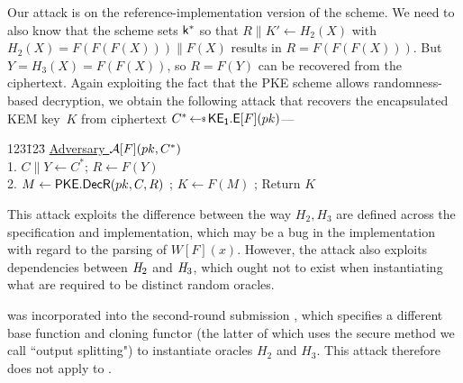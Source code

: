 Our attack is on the reference-implementation version of the scheme. We need to also know that the scheme sets $\mathsf{k}^*$ so that $R\|K'\gets H_2(X)$ with $H_2(X) = F(F(F(X)))\|F(X)$ results in $R = F(F(F(X)))$. But $Y=H_3(X) = F(F(X))$, so $R=F(Y)$ can be recovered from the ciphertext. Again exploiting the fact that the PKE scheme allows randomness-based decryption, we obtain the following attack that recovers the encapsulated KEM key~$K$ from  ciphertext $C^* \allowbreak \getsr \allowbreak \GkemEnc{1}[F](\pk)$--- 

\begin{tabbing}
	123\=123\=\kill
	\underline{Adversary $\mathcal{A}[F](pk,C^*)$}  \\[2pt]
	1. \> $C\|Y\gets C^*$; $R \gets F(Y)$\\
	2. \> $M\gets \mathsf{{\mathsf{PKE}}.DecR}(pk,C,R)$ ;
	 $K \gets F(M)$ ; Return $K$
\end{tabbing}


\noindent This attack exploits the difference between the way $H_2,H_3$ are defined across the specification and implementation, which may be a bug in the implementation with regard to the parsing of $W[F](x)$. However, the attack also exploits dependencies between $\mathit{H}_2$ and $\mathit{H}_3$, which ought not to exist when instantiating what are required to be distinct random oracles. 

 was incorporated into the second-round submission , which specifies a different base function and cloning functor (the latter of which uses the secure method we call ``output splitting") to instantiate oracles $H_2$ and $H_3$. This attack therefore does not apply to .
%

